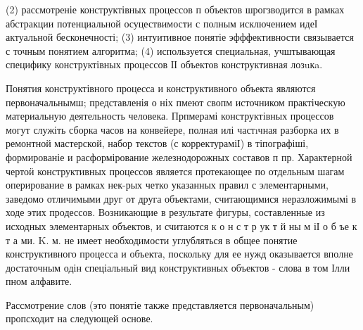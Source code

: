 \documentclass[10pt]{article}
\begin{document}
(2) рассмотреніе конструктівных процессов п объектов шрогзводится в рамках абстракции потенциальной осуцествимости с полным исключением идеІ актуальной бесконечності; (3) интуитивное понятіе эфффективности связывается с точным понятием алгоритма; (4) используется специальная, учштывающая специфику конструктівных процессов ІІ объектов конструктивная лозuкa.



Понятия конструктівного процесса и конструктивного объекта являются первоначальнымш; представленія о ніх пмеют свопм источником практіческую материальную деятельность человека. Прпмерамі конструктівных процессов могут служіть сборка часов на конвейере, полная илі частıчная разборка их в ремонтной мастерской, набор текстов (с корректураміІ) в тіпографіші, формированіе и расформірование железнодорожных составов п пр. Характерной чертоӥ конструктивных процессов является протекающее по отдельным шагам оперирование в рамках нек-рых четко указанных правил с элементарными, заведомо отличимыми друг от друга объектами, считающимися неразложимымі в ходе этих продессов. Возникающие в результате фигуры, составленные из исходных элементарных объектов, и считаются к о н с т р ук т й ны м іІ о б ъе к т а ми. K. м. не имеет необходимости углубляться в общее понятие конструктивного процесса и объекта, поскольку для ее нужд оказывается вполне достаточным одін спеціальный вид конструктивных объектов - слова в том Ілли пном алфавите.



Рассмотрение слов (это понятіе также представляется первоначальным) пропсходит на следующей основе.
\end{document}
